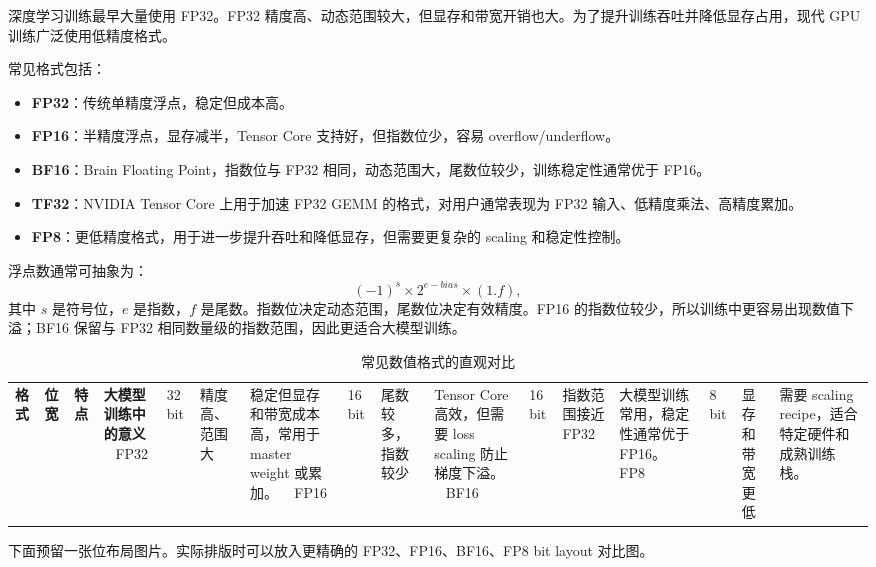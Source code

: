 深度学习训练最早大量使用 FP32。FP32 精度高、动态范围较大，但显存和带宽开销也大。为了提升训练吞吐并降低显存占用，现代 GPU 训练广泛使用低精度格式。

常见格式包括：

\begin{itemize}
\item \textbf{FP32}：传统单精度浮点，稳定但成本高。
\item \textbf{FP16}：半精度浮点，显存减半，Tensor Core 支持好，但指数位少，容易 overflow/underflow。
\item \textbf{BF16}：Brain Floating Point，指数位与 FP32 相同，动态范围大，尾数位较少，训练稳定性通常优于 FP16。
\item \textbf{TF32}：NVIDIA Tensor Core 上用于加速 FP32 GEMM 的格式，对用户通常表现为 FP32 输入、低精度乘法、高精度累加。
\item \textbf{FP8}：更低精度格式，用于进一步提升吞吐和降低显存，但需要更复杂的 scaling 和稳定性控制。
\end{itemize}

浮点数通常可抽象为：
\[
(-1)^{s}\times 2^{e-bias}\times (1.f),
\]
其中 $s$ 是符号位，$e$ 是指数，$f$ 是尾数。指数位决定动态范围，尾数位决定有效精度。FP16 的指数位较少，所以训练中更容易出现数值下溢；BF16 保留与 FP32 相同数量级的指数范围，因此更适合大模型训练。

\begin{table}[H]
\centering
\small
\caption{常见数值格式的直观对比}
\label{tab:numeric-format-comparison}
\begin{tabular}{p{}p{}p{}p{}}
\toprule
\textbf{格式} & \textbf{位宽} & \textbf{特点} & \textbf{大模型训练中的意义} \
\midrule
FP32
& 32 bit
& 精度高、范围大
& 稳定但显存和带宽成本高，常用于 master weight 或累加。 \
\midrule
FP16
& 16 bit
& 尾数较多，指数较少
& Tensor Core 高效，但需要 loss scaling 防止梯度下溢。 \
\midrule
BF16
& 16 bit
& 指数范围接近 FP32
& 大模型训练常用，稳定性通常优于 FP16。 \
\midrule
FP8
& 8 bit
& 显存和带宽更低
& 需要 scaling recipe，适合特定硬件和成熟训练栈。 \
\bottomrule
\end{tabular}
\end{table}

下面预留一张位布局图片。实际排版时可以放入更精确的 FP32、FP16、BF16、FP8 bit layout 对比图。

